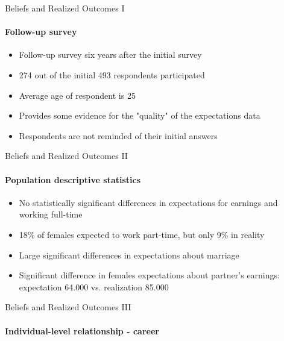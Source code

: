\documentclass[12pt]{beamer}
\begin{document}
\begin{frame}{Beliefs and Realized Outcomes I}
    \framesubtitle{Follow-up survey}
    \begin{itemize}
        \item Follow-up survey six years after the initial survey
        \item 274 out of the initial 493 respondents participated
        \item Average age of respondent is 25
        \item Provides some evidence for the "quality" of the expectations data
        \item Respondents are not reminded of their initial answers
    \end{itemize}
    
\end{frame}

\begin{frame}{Beliefs and Realized Outcomes II}
    \framesubtitle{Population descriptive statistics}
    \begin{itemize}
        \item No statistically significant differences in expectations for earnings and working full-time
        \item 18\% of females expected to work part-time, but only 9\% in reality
        \item Large significant differences in expectations about marriage
        \item Significant difference in females expectations about partner's earnings: expectation 64.000 vs. realization 85.000
    \end{itemize}
\end{frame}

\begin{frame}{Beliefs and Realized Outcomes III}
    \framesubtitle{Individual-level relationship - career}
    \begin{center}
    \end{center}
\end{frame}
\end{document}

